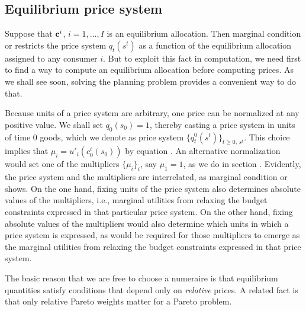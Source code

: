 \subsection{Equilibrium price system}
  Suppose that ${\bf c}^i$, $i=1, \ldots, I$  is an equilibrium allocation.
Then    marginal condition  or  restricts
the price system $q_t(s^t)$ as a function of the equilibrium allocation assigned
to any consumer $i$. But to exploit this fact in computation, we need  first to find a way  to compute
an equilibrium allocation before  computing prices.  As we shall see soon, solving the planning problem provides a convenient way
to do that.


  Because  units of a
price system are arbitrary, one price
can be  normalized
at any positive value.  We shall set $q_0(s_0)= 1$,
thereby casting a  price system in units of time $0$
  goods, which we denote as price system
$\{q^0_t(s^t)\}_{t\geq0,\,s^t}$.
This choice implies that
 $\mu_i  =  u'_i(c_0^i(s_0)) $ by equation .
An alternative  normalization would set  one of the
multipliers $\{\mu_i\}_i$, say $\mu_1=1$, as
we do 
in section . Evidently, the price 
system and the multipliers are interrelated,
as  marginal condition  
or  shows. On the one hand, fixing 
units of the price system also determines  
absolute values of the multipliers, i.e., 
marginal utilities from relaxing the budget
constraints expressed in that particular price 
system. On the other hand, fixing 
absolute values of the multipliers would 
also determine  which units in which a  price system is 
expressed, as would be required for those multipliers to 
emerge as the marginal utilities from relaxing 
the budget constraints expressed in that
price system. 


The basic reason that we are free to choose a numeraire is that equilibrium quantities satisfy conditions that depend only  on {\it relative}
prices.  A related fact is that   only relative Pareto
weights matter for a Pareto problem.




